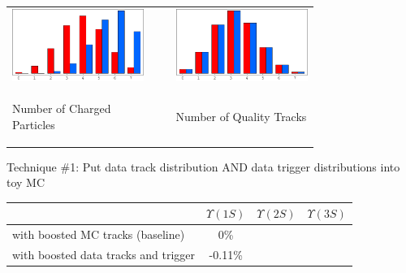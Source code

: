 \documentclass[landscape]{article}
\begin{document}
\begin{center}
  \begin{tabular}{p{0.35\linewidth} p{0.05\linewidth} p{0.35\linewidth}}
    \includegraphics[width=\linewidth]{effcheck_datavmc1.pdf} & &
    \includegraphics[width=\linewidth]{effcheck_datavmc2.pdf} \\
    \begin{center} \vspace{-1 cm} Number of Charged Particles \end{center} & &
    \begin{center} \vspace{-1 cm} Number of Quality Tracks \end{center}
  \end{tabular}
\end{center}

Technique \#1:  Put data track distribution AND data trigger distributions into toy MC

\begin{center}
  \renewcommand{\arraystretch}{1.25}
  \begin{tabular}{p{12 cm} c c c}
  & \mbox{\hspace{0.5 cm}} $\Upsilon(1S)$ \mbox{\hspace{0.5 cm}} & \mbox{\hspace{0.5 cm}} $\Upsilon(2S)$ \mbox{\hspace{0.5 cm}} & \mbox{\hspace{0.5 cm}} $\Upsilon(3S)$ \mbox{\hspace{0.5 cm}} \\\hline
  with boosted MC tracks (baseline) & 0\% & & \\
  with boosted data tracks and trigger & -0.11\% & & \\
  \end{tabular}
\end{center}
\end{document}
